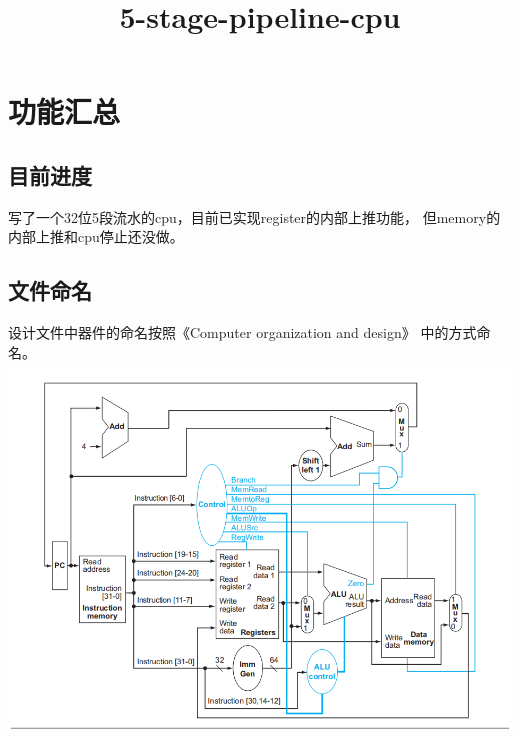 \documentclass{article}
\newcommand{\tab}{\makebox[2em][l]{}}   %
\begin{document}

   \title{\heiti{}5-stage-pipeline-cpu}
   \date{}
   \maketitle \vspace{-4em}




   {\centering\section {功能汇总}}

   \subsection{目前进度}
   \begin{flushleft}
   \tab 写了一个32位5段流水的cpu，目前已实现register的内部上推功能，
   但memory的内部上推和cpu停止还没做。
   \end{flushleft}

   \subsection{文件命名}
   \begin{flushleft}
   \tab 设计文件中器件的命名按照《Computer organization and design》
   中的方式命名。\\
   \mbox{} \hfill{\includegraphics[scale=0.5]{1.png}}\hfill \mbox{}\\
   \end{flushleft}
\end{document}
